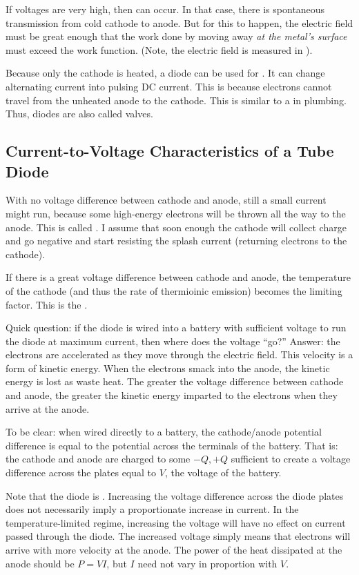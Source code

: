 \documentclass[11pt, oneside]{amsart}
\begin{document}
If voltages are very high, then  can
occur. In that case, there is spontaneous transmission from cold cathode
to anode. But for this to happen, the electric field must be great
enough that the work done by moving away \emph{at the metal's surface}
must exceed the work function. (Note, the electric field is measured in
).

Because only the cathode is heated, a diode can be used for
. It can change alternating current into pulsing
DC current. This is because electrons cannot travel from the unheated
anode to the cathode. This is similar to a  in plumbing.
Thus, diodes are also called valves.

\subsection{Current-to-Voltage Characteristics of a Tube Diode}

With no voltage difference between cathode and anode, still a small
current might run, because some high-energy electrons will be thrown all
the way to the anode. This is called . I assume
that soon enough the cathode will collect charge and go negative and
start resisting the splash current (returning electrons to the cathode).

If there is a great voltage difference between cathode and anode, the
temperature of the cathode (and thus the rate of thermioinic emission)
becomes the limiting factor. This is the .

Quick question: if the diode is wired into a battery with sufficient
voltage to run the diode at maximum current, then where does the voltage
``go?'' Answer: the electrons are accelerated as they move through the
electric field. This velocity is a form of kinetic energy. When the
electrons smack into the anode, the kinetic energy is lost as waste
heat. The greater the voltage difference between cathode and anode, the
greater the kinetic energy imparted to the electrons when they arrive at
the anode.

To be clear: when wired directly to a battery, the cathode/anode
potential difference is equal to the potential across the terminals of
the battery. That is: the cathode and anode are charged to some $-Q, +Q$
sufficient to create a voltage difference across the plates equal to
$V$, the voltage of the battery.

Note that the diode is . Increasing the voltage
difference across the diode plates does not necessarily imply a
proportionate increase in current. In the temperature-limited regime,
increasing the voltage will have no effect on current passed through the
diode. The increased voltage simply means that electrons will arrive
with more velocity at the anode. The power of the heat dissipated at the
anode should be $P=VI$, but $I$ need not vary in proportion with $V$.
\end{document}

